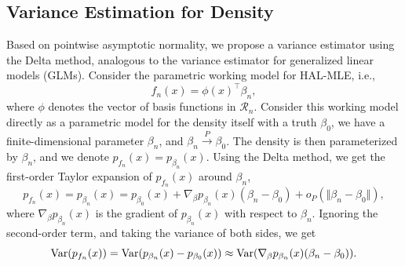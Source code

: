 \subsection{Variance Estimation for Density}  \label{density_sd_section}
Based on pointwise asymptotic normality, we propose a variance estimator using the Delta method, 
analogous to the variance estimator for generalized linear models (GLMs). 
Consider the parametric working model for HAL-MLE, i.e., 
\[
f_n(x) = \phi(x)^{\top}\beta_n,
\]
where $\phi$ denotes the vector of basis functions in $\mathcal{R}_n$. Consider this working model directly as a parametric model for the density itself with a truth $\beta_0$, we have a finite-dimensional parameter $\beta_n$, and $\beta_n \xrightarrow{P} \beta_0$. The density is then parameterized by $\beta_n$, and we denote $p_{f_n}(x) = p_{\beta_n}(x)$. Using the Delta method, we get the first-order Taylor expansion of $p_{f_n}(x)$ around $\beta_n$,
\[
p_{f_n}(x) = p_{\beta_n}(x) = p_{\beta_0}(x) + \nabla_\beta p_{\beta_n}(x) (\beta_n - \beta_0) + o_P(\Vert \beta_n - \beta_0 \Vert),
\]
where $\nabla_\beta p_{\beta_n}(x)$ is the gradient of $p_{\beta_n}(x)$ with respect to $\beta_n$.
Ignoring the second-order term, and taking the variance of both sides, we get
\[
\mathrm{Var}(p_{f_n}(x)) = \mathrm{Var}(p_{\beta_n}(x) - p_{\beta_0}(x)) \approx \mathrm{Var}(\nabla_\beta p_{\beta_n}(x) (\beta_n - \beta_0)).
\]



